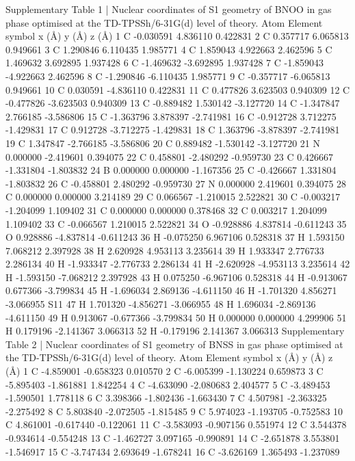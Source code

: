 Supplementary Table 1 | Nuclear coordinates of S1 geometry of BNOO in gas phase
optimised at the TD-TPSSh/6-31G(d) level of theory.
Atom Element symbol x (Å) y (Å) z (Å)
1 C -0.030591 4.836110 0.422831
2 C 0.357717 6.065813 0.949661
3 C 1.290846 6.110435 1.985771
4 C 1.859043 4.922663 2.462596
5 C 1.469632 3.692895 1.937428
6 C -1.469632 -3.692895 1.937428
7 C -1.859043 -4.922663 2.462596
8 C -1.290846 -6.110435 1.985771
9 C -0.357717 -6.065813 0.949661
10 C 0.030591 -4.836110 0.422831
11 C 0.477826 3.623503 0.940309
12 C -0.477826 -3.623503 0.940309
13 C -0.889482 1.530142 -3.127720
14 C -1.347847 2.766185 -3.586806
15 C -1.363796 3.878397 -2.741981
16 C -0.912728 3.712275 -1.429831
17 C 0.912728 -3.712275 -1.429831
18 C 1.363796 -3.878397 -2.741981
19 C 1.347847 -2.766185 -3.586806
20 C 0.889482 -1.530142 -3.127720
21 N 0.000000 -2.419601 0.394075
22 C 0.458801 -2.480292 -0.959730
23 C 0.426667 -1.331804 -1.803832
24 B 0.000000 0.000000 -1.167356
25 C -0.426667 1.331804 -1.803832
26 C -0.458801 2.480292 -0.959730
27 N 0.000000 2.419601 0.394075
28 C 0.000000 0.000000 3.214189
29 C 0.066567 -1.210015 2.522821
30 C -0.003217 -1.204099 1.109402
31 C 0.000000 0.000000 0.378468
32 C 0.003217 1.204099 1.109402
33 C -0.066567 1.210015 2.522821
34 O -0.928886 4.837814 -0.611243
35 O 0.928886 -4.837814 -0.611243
36 H -0.075250 6.967106 0.528318
37 H 1.593150 7.068212 2.397928
38 H 2.620928 4.953113 3.235614
39 H 1.933347 2.776733 2.286134
40 H -1.933347 -2.776733 2.286134
41 H -2.620928 -4.953113 3.235614
42 H -1.593150 -7.068212 2.397928
43 H 0.075250 -6.967106 0.528318
44 H -0.913067 0.677366 -3.799834
45 H -1.696034 2.869136 -4.611150
46 H -1.701320 4.856271 -3.066955
S11
47 H 1.701320 -4.856271 -3.066955
48 H 1.696034 -2.869136 -4.611150
49 H 0.913067 -0.677366 -3.799834
50 H 0.000000 0.000000 4.299906
51 H 0.179196 -2.141367 3.066313
52 H -0.179196 2.141367 3.066313
Supplementary Table 2 | Nuclear coordinates of S1 geometry of BNSS in gas phase optimised
at the TD-TPSSh/6-31G(d) level of theory.
Atom Element symbol x (Å) y (Å) z (Å)
1 C -4.859001 -0.658323 0.010570
2 C -6.005399 -1.130224 0.659873
3 C -5.895403 -1.861881 1.842254
4 C -4.633090 -2.080683 2.404577
5 C -3.489453 -1.590501 1.778118
6 C 3.398366 -1.802436 -1.663430
7 C 4.507981 -2.363325 -2.275492
8 C 5.803840 -2.072505 -1.815485
9 C 5.974023 -1.193705 -0.752583
10 C 4.861001 -0.617440 -0.122061
11 C -3.583093 -0.907156 0.551974
12 C 3.544378 -0.934614 -0.554248
13 C -1.462727 3.097165 -0.990891
14 C -2.651878 3.553801 -1.546917
15 C -3.747434 2.693649 -1.678241
16 C -3.626169 1.365493 -1.237089
